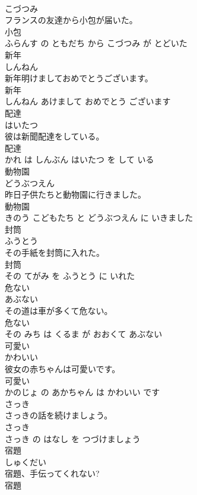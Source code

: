 \documentclass[8pt]{extreport}
\begin{document}
\begin{CJK}{UTF8}{min}
\\	こづつみ			
\\	フランスの友達から小包が届いた。	
\\	小包 
\\	ふらんす の ともだち から こづつみ が とどいた			
\\	新年	
\\	しんねん			
\\	新年明けましておめでとうございます。	
\\	新年 
\\	しんねん あけまして おめでとう ございます			
\\	配達	
\\	はいたつ			
\\	彼は新聞配達をしている。	
\\	配達 
\\	かれ は しんぶん はいたつ を して いる			
\\	動物園	
\\	どうぶつえん			
\\	昨日子供たちと動物園に行きました。	
\\	動物園 
\\	きのう こどもたち と どうぶつえん に いきました			
\\	封筒	
\\	ふうとう			
\\	その手紙を封筒に入れた。	
\\	封筒 
\\	その てがみ を ふうとう に いれた			
\\	危ない	
\\	あぶない			
\\	その道は車が多くて危ない。	
\\	危ない 
\\	その みち は くるま が おおくて あぶない			
\\	可愛い	
\\	かわいい			
\\	彼女の赤ちゃんは可愛いです。	
\\	可愛い 
\\	かのじょ の あかちゃん は かわいい です			
\\	さっき	
\\	さっきの話を続けましょう。	
\\	さっき 
\\	さっき の はなし を つづけましょう			
\\	宿題	
\\	しゅくだい			
\\	宿題、手伝ってくれない?	
\\	宿題 

\end{CJK}
\end{document}
